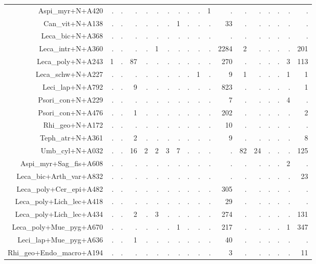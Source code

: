 \documentclass[a4paper, 11]{article}\usepackage[]{graphicx}\usepackage[]{color}
\begin{document}
\begin{table}
\begin{tabular}{rrrrrrrrrrrrrrrrrr}
  Aspi\_myr+N+A420 & . & . & . & . & . & . & . & . & . & 1 & . & . & . & . & . & . & . \\ 
  Can\_vit+N+A138 & . & . & . & . & . & . & 1 & . & . & . & 33 & . & . & . & . & . & . \\ 
  Leca\_bic+N+A368 & . & . & . & . & . & . & . & . & . & . & . & . & . & . & . & . & . \\ 
  Leca\_intr+N+A360 & . & . & . & . & 1 & . & . & . & . & . & 2284 & 2 & . & . & . & . & 201 \\ 
  Leca\_poly+N+A243 & 1 & . & 87 & . & . & . & . & . & . & . & 270 & . & . & . & . & 3 & 113 \\ 
  Leca\_schw+N+A227 & . & . & . & . & . & . & . & . & 1 & . & 9 & 1 & . & . & . & 1 & 1 \\ 
  Leci\_lap+N+A792 & . & . & 9 & . & . & . & . & . & . & . & 823 & . & . & . & . & . & 1 \\ 
  Psori\_con+N+A229 & . & . & . & . & . & . & . & . & . & . & 7 & . & . & . & . & 4 & . \\ 
  Psori\_con+N+A476 & . & . & 1 & . & . & . & . & . & . & . & 202 & . & . & . & . & . & 2 \\ 
  Rhi\_geo+N+A172 & . & . & . & . & . & . & . & . & . & . & 10 & . & . & . & . & . & . \\ 
  Teph\_atr+N+A361 & . & . & 2 & . & . & . & . & . & . & . & 9 & . & . & . & . & . & 8 \\ 
  Umb\_cyl+N+A032 & . & . & 16 & 2 & 2 & 3 & 7 & . & . & . & . & 82 & 24 & . & . & . & 125 \\ 
  Aspi\_myr+Sag\_fis+A608 & . & . & . & . & . & . & . & . & . & . & . & . & . & . & . & 2 & . \\ 
  Leca\_bic+Arth\_var+A832 & . & . & . & . & . & . & . & . & . & . & . & . & . & . & . & . & 23 \\ 
  Leca\_poly+Cer\_epi+A482 & . & . & . & . & . & . & . & . & . & . & 305 & . & . & . & . & . & . \\ 
  Leca\_poly+Lich\_lec+A418 & . & . & . & . & . & . & . & . & . & . & 29 & . & . & . & . & . & . \\ 
  Leca\_poly+Lich\_lec+A434 & . & . & 2 & . & 3 & . & . & . & . & . & 274 & . & . & . & . & . & 131 \\ 
  Leca\_poly+Mue\_pyg+A670 & . & . & . & . & . & . & 1 & . & . & . & 217 & . & . & . & . & 1 & 347 \\ 
  Leci\_lap+Mue\_pyg+A636 & . & . & 1 & . & . & . & . & . & . & . & 40 & . & . & . & . & . & . \\ 
  Rhi\_geo+Endo\_macro+A194 & . & . & . & . & . & . & . & . & . & . & 3 & . & . & . & . & . & 11 \\ 

\end{tabular}
\end{table}
\end{document}
